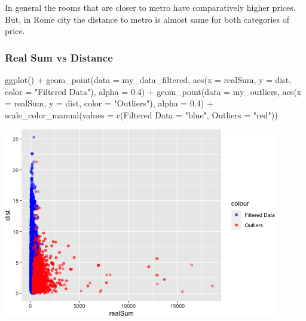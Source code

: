 \documentclass[
]{article}
\newenvironment{Shaded}{\begin{snugshade}}{\end{snugshade}}
\newcommand{\AttributeTok}[1]{\textcolor[rgb]{0.77,0.63,0.00}{#1}}
\newcommand{\FloatTok}[1]{\textcolor[rgb]{0.00,0.00,0.81}{#1}}
\newcommand{\FunctionTok}[1]{\textcolor[rgb]{0.00,0.00,0.00}{#1}}
\newcommand{\NormalTok}[1]{#1}
\newcommand{\OtherTok}[1]{\textcolor[rgb]{0.56,0.35,0.01}{#1}}
\newcommand{\SpecialCharTok}[1]{\textcolor[rgb]{0.00,0.00,0.00}{#1}}
\newcommand{\StringTok}[1]{\textcolor[rgb]{0.31,0.60,0.02}{#1}}
\begin{document}
In general the rooms that are closer to metro have comparatively higher
prices. But, in Rome city the distance to metro is almost same for both
categories of price.

\hypertarget{real-sum-vs-distance}{%
\subsubsection{Real Sum vs Distance}\label{real-sum-vs-distance}}

\begin{Shaded}
\begin{Highlighting}[]
\FunctionTok{ggplot}\NormalTok{() }\SpecialCharTok{+} \FunctionTok{geom\_point}\NormalTok{(}\AttributeTok{data =}\NormalTok{ my\_data\_filtered, }\FunctionTok{aes}\NormalTok{(}\AttributeTok{x =}\NormalTok{ realSum,}
    \AttributeTok{y =}\NormalTok{ dist, }\AttributeTok{color =} \StringTok{"Filtered Data"}\NormalTok{), }\AttributeTok{alpha =} \FloatTok{0.4}\NormalTok{) }\SpecialCharTok{+} \FunctionTok{geom\_point}\NormalTok{(}\AttributeTok{data =}\NormalTok{ my\_outliers,}
    \FunctionTok{aes}\NormalTok{(}\AttributeTok{x =}\NormalTok{ realSum, }\AttributeTok{y =}\NormalTok{ dist, }\AttributeTok{color =} \StringTok{"Outliers"}\NormalTok{), }\AttributeTok{alpha =} \FloatTok{0.4}\NormalTok{) }\SpecialCharTok{+}
    \FunctionTok{scale\_color\_manual}\NormalTok{(}\AttributeTok{values =} \FunctionTok{c}\NormalTok{(}\StringTok{\textasciigrave{}}\AttributeTok{Filtered Data}\StringTok{\textasciigrave{}} \OtherTok{=} \StringTok{"blue"}\NormalTok{, }\AttributeTok{Outliers =} \StringTok{"red"}\NormalTok{))}
\end{Highlighting}
\end{Shaded}

\includegraphics{Project_files/figure-latex/unnamed-chunk-15-1.png}
\end{document}
